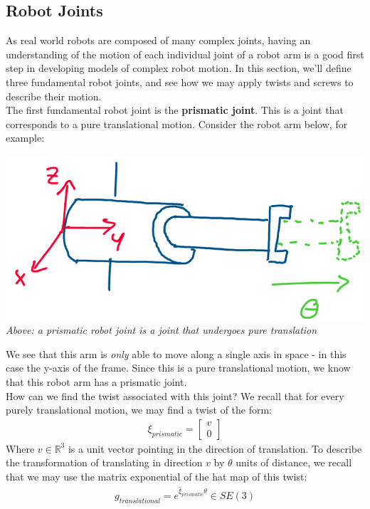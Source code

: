 \documentclass[oneside]{book}
\begin{document}
\subsection{Robot Joints}
As real world robots are composed of many complex joints, having an understanding of the motion of each individual joint of a robot arm is a good first step in developing models of complex robot motion. In this section, we'll define three fundamental robot joints, and see how we may apply twists and screws to describe their motion.\\
The first fundamental robot joint is the \textbf{prismatic joint}. This is a joint that corresponds to a pure translational motion. Consider the robot arm below, for example:
\begin{center}
    \includegraphics[scale=0.3]{images/prismaticJoint.png}\\
    \textit{Above: a prismatic robot joint is a joint that undergoes pure translation}
\end{center}
We see that this arm is \textit{only} able to move along a single axis in space - in this case the y-axis of the frame. Since this is a pure translational motion, we know that this robot arm has a prismatic joint.\\
How can we find the twist associated with this joint? We recall that for every purely translational motion, we may find a twist of the form:
\begin{align}
    \xi_{prismatic} = 
    \begin{bmatrix}
    v\\
    0
    \end{bmatrix}
\end{align}
Where $v \in \mathbb{R}^3$ is a unit vector pointing in the direction of translation. To describe the transformation of translating in direction $v$ by $\theta$ units of distance, we recall that we may use the matrix exponential of the hat map of this twist:
\begin{align}
    g_{translational} = e^{\hat\xi_{prismatic}\theta} \in SE(3)
\end{align}
\end{document}
